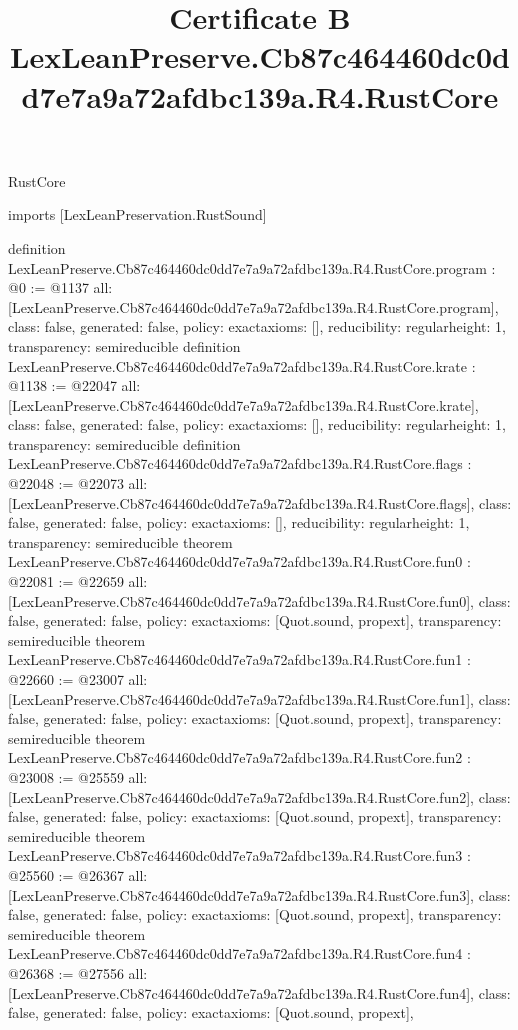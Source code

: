 \begin{lexlean}{RustCore}
\title{Certificate B LexLeanPreserve.Cb87c464460dc0dd7e7a9a72afdbc139a.R4.RustCore}
\begin{coremodule}
imports [LexLeanPreservation.RustSound]

definition LexLeanPreserve.Cb87c464460dc0dd7e7a9a72afdbc139a.R4.RustCore.program : @0 := @1137 {
  all: [LexLeanPreserve.Cb87c464460dc0dd7e7a9a72afdbc139a.R4.RustCore.program],
  class: false,
  generated: false,
  policy: exact{axioms: []},
  reducibility: regular{height: 1},
  transparency: semireducible
}
definition LexLeanPreserve.Cb87c464460dc0dd7e7a9a72afdbc139a.R4.RustCore.krate : @1138 := @22047 {
  all: [LexLeanPreserve.Cb87c464460dc0dd7e7a9a72afdbc139a.R4.RustCore.krate],
  class: false,
  generated: false,
  policy: exact{axioms: []},
  reducibility: regular{height: 1},
  transparency: semireducible
}
definition LexLeanPreserve.Cb87c464460dc0dd7e7a9a72afdbc139a.R4.RustCore.flags : @22048 := @22073 {
  all: [LexLeanPreserve.Cb87c464460dc0dd7e7a9a72afdbc139a.R4.RustCore.flags],
  class: false,
  generated: false,
  policy: exact{axioms: []},
  reducibility: regular{height: 1},
  transparency: semireducible
}
theorem LexLeanPreserve.Cb87c464460dc0dd7e7a9a72afdbc139a.R4.RustCore.fun0 : @22081 := @22659 {
  all: [LexLeanPreserve.Cb87c464460dc0dd7e7a9a72afdbc139a.R4.RustCore.fun0],
  class: false,
  generated: false,
  policy: exact{axioms: [Quot.sound, propext]},
  transparency: semireducible
}
theorem LexLeanPreserve.Cb87c464460dc0dd7e7a9a72afdbc139a.R4.RustCore.fun1 : @22660 := @23007 {
  all: [LexLeanPreserve.Cb87c464460dc0dd7e7a9a72afdbc139a.R4.RustCore.fun1],
  class: false,
  generated: false,
  policy: exact{axioms: [Quot.sound, propext]},
  transparency: semireducible
}
theorem LexLeanPreserve.Cb87c464460dc0dd7e7a9a72afdbc139a.R4.RustCore.fun2 : @23008 := @25559 {
  all: [LexLeanPreserve.Cb87c464460dc0dd7e7a9a72afdbc139a.R4.RustCore.fun2],
  class: false,
  generated: false,
  policy: exact{axioms: [Quot.sound, propext]},
  transparency: semireducible
}
theorem LexLeanPreserve.Cb87c464460dc0dd7e7a9a72afdbc139a.R4.RustCore.fun3 : @25560 := @26367 {
  all: [LexLeanPreserve.Cb87c464460dc0dd7e7a9a72afdbc139a.R4.RustCore.fun3],
  class: false,
  generated: false,
  policy: exact{axioms: [Quot.sound, propext]},
  transparency: semireducible
}
theorem LexLeanPreserve.Cb87c464460dc0dd7e7a9a72afdbc139a.R4.RustCore.fun4 : @26368 := @27556 {
  all: [LexLeanPreserve.Cb87c464460dc0dd7e7a9a72afdbc139a.R4.RustCore.fun4],
  class: false,
  generated: false,
  policy: exact{axioms: [Quot.sound, propext]},
}
\end{coremodule}
\end{lexlean}
